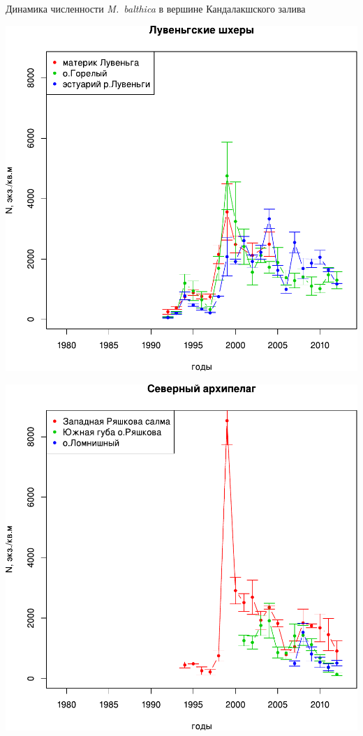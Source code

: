 \documentclass{beamer}
\begin{document}
\begin{frame}{Динамика численности {\it M.~balthica} в вершине Кандалакшского залива}
	\begin{minipage}[t]{.49\linewidth}
		\begin{center}
			\includegraphics[width=\textwidth]{N2_dynamic_Luvenga_all.pdf}
		\end{center}
	\end{minipage}
%
	\begin{minipage}[t]{.49\linewidth}
		\begin{center}
			\includegraphics[width=\textwidth]{N2_dynamic_North_all.pdf}
		\end{center}
	\end{minipage}
\end{frame}
\end{document}
